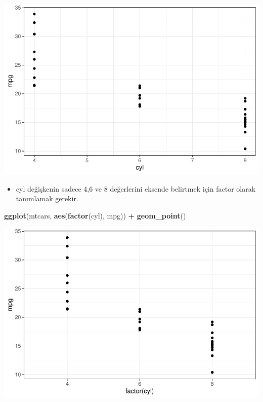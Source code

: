 \documentclass[
  oneside]{book}
\newenvironment{Shaded}{\begin{snugshade}}{\end{snugshade}}
\newcommand{\FunctionTok}[1]{\textcolor[rgb]{0.13,0.29,0.53}{\textbf{#1}}}
\newcommand{\NormalTok}[1]{#1}
\newcommand{\SpecialCharTok}[1]{\textcolor[rgb]{0.81,0.36,0.00}{\textbf{#1}}}
\providecommand{\tightlist}{%
  \setlength{\itemsep}{0pt}\setlength{\parskip}{0pt}}
\begin{document}
\begin{center}\includegraphics[width=1\linewidth]{15-betimleyici-istatistik_files/figure-latex/unnamed-chunk-38-1} \end{center}

\begin{itemize}
\tightlist
\item
  cyl değişkenin sadece 4,6 ve 8 değerlerini eksende belirtmek için factor olarak tanımlamak gerekir.
\end{itemize}

\begin{Shaded}
\begin{Highlighting}[]
\FunctionTok{ggplot}\NormalTok{(mtcars, }\FunctionTok{aes}\NormalTok{(}\FunctionTok{factor}\NormalTok{(cyl), mpg)) }\SpecialCharTok{+}
  \FunctionTok{geom\_point}\NormalTok{()}
\end{Highlighting}
\end{Shaded}

\begin{center}\includegraphics[width=1\linewidth]{15-betimleyici-istatistik_files/figure-latex/unnamed-chunk-39-1} \end{center}
\end{document}

